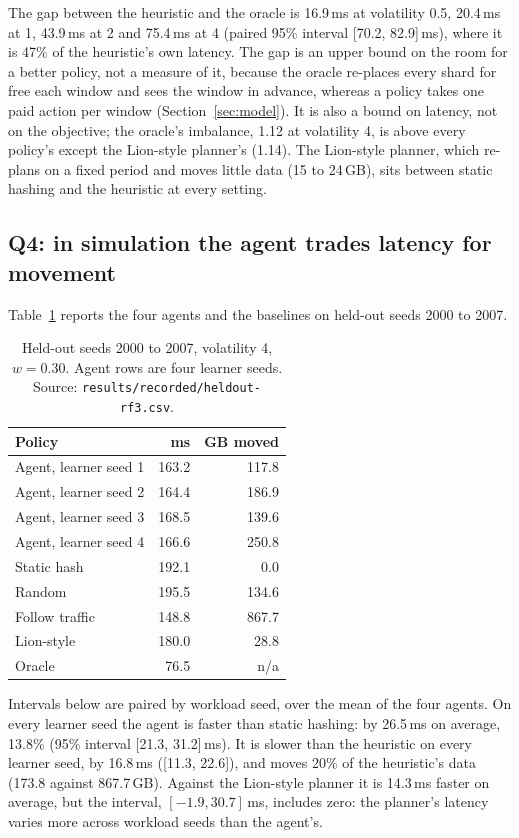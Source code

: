 The gap between the heuristic and the oracle is 16.9\,ms at volatility 0.5,
20.4\,ms at 1, 43.9\,ms at 2 and 75.4\,ms at 4 (paired 95\% interval [70.2,
82.9]\,ms), where it is 47\% of the heuristic's own latency. The gap is an
upper bound on the room for a better policy, not a measure of it, because the
oracle re-places every shard for free each window and sees the window in advance, whereas a policy takes one paid action per window
(Section~\ref{sec:model}). It is also a bound on latency, not on the objective; the oracle's
imbalance, 1.12 at volatility 4, is above every policy's except the Lion-style
planner's (1.14). The Lion-style planner, which
re-plans on a fixed period and moves little data (15 to 24\,GB), sits between
static hashing and the heuristic at every setting.

\subsection{Q4: in simulation the agent trades latency for movement}

Table~\ref{tab:agent} reports the four agents and the baselines on held-out
seeds 2000 to 2007.

\begin{table}[t]
\caption{Held-out seeds 2000 to 2007, volatility 4, $w=0.30$. Agent rows are
four learner seeds. Source: \texttt{results/recorded/heldout-rf3.csv}.}
\label{tab:agent}
\centering
\begin{tabular}{lrr}
\toprule
Policy & ms & GB moved \\
\midrule
Agent, learner seed 1 & 163.2 & 117.8 \\
Agent, learner seed 2 & 164.4 & 186.9 \\
Agent, learner seed 3 & 168.5 & 139.6 \\
Agent, learner seed 4 & 166.6 & 250.8 \\
\addlinespace
Static hash   & 192.1 &   0.0 \\
Random        & 195.5 & 134.6 \\
Follow traffic& 148.8 & 867.7 \\
Lion-style    & 180.0 &  28.8 \\
Oracle        &  76.5 &   n/a \\
\bottomrule
\end{tabular}
\end{table}

Intervals below are paired by workload seed, over the mean of the four
agents. On every learner seed the agent is faster than static hashing: by
26.5\,ms on average, 13.8\% (95\% interval [21.3, 31.2]\,ms). It is slower
than the heuristic on every learner seed, by 16.8\,ms ([11.3, 22.6]), and
moves 20\% of the heuristic's data (173.8 against 867.7\,GB). Against the
Lion-style planner it is 14.3\,ms faster on average, but the interval,
$[-1.9, 30.7]$\,ms, includes zero: the planner's latency varies more across
workload seeds than the agent's.

